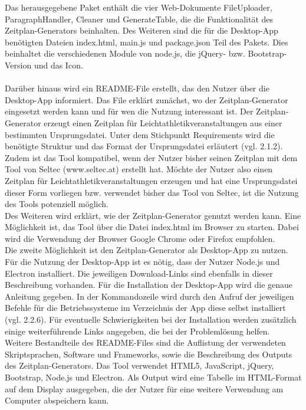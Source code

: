 Das herausgegebene Paket enthält die vier Web-Dokumente FileUploader, ParagraphHandler, Cleaner und GenerateTable, die die Funktionalität des Zeitplan-Generators beinhalten. Des Weiteren sind die für die Desktop-App benötigten Dateien index.html, main.js und package.json Teil des Pakets. Dies beinhaltet die verschiedenen Module von node.js, die jQuery- bzw. Bootstrap-Version und das Icon. \\
\\
Darüber hinaus wird ein README-File erstellt, das den Nutzer über die Desktop-App informiert. Das File erklärt zunächst, wo der Zeitplan-Generator eingesetzt werden kann und für wen die Nutzung interessant ist. Der Zeitplan-Generator erzeugt einen Zeitplan für Leichtathletikveranstaltungen aus einer bestimmten Ursprungsdatei. Unter dem Stichpunkt Requirements wird die benötigte Struktur und das Format der Ursprungsdatei erläutert (vgl. 2.1.2). Zudem ist das Tool kompatibel, wenn der Nutzer bisher seinen Zeitplan mit dem Tool von Seltec (www.seltec.at) erstellt hat. Möchte der Nutzer also einen Zeitplan für Leichtathletikveranstaltungen erzeugen und hat eine Ursprungsdatei dieser Form vorliegen bzw. verwendet bisher das Tool von Seltec, ist die Nutzung des Tools potenziell möglich.\\
Des Weiteren wird erklärt, wie der Zeitplan-Generator genutzt werden kann. Eine Möglichkeit ist, das Tool über die Datei index.html im Browser zu starten. Dabei wird die Verwendung der Browser Google Chrome oder Firefox empfohlen. \\
Die zweite Möglichkeit ist den Zeitplan-Generator als Desktop-App zu nutzen. Für die Nutzung der Desktop-App ist es nötig, dass der Nutzer Node.js und Electron installiert. Die jeweiligen Download-Links sind ebenfalls in dieser Beschreibung vorhanden. Für die Installation der Desktop-App wird die genaue Anleitung gegeben. In der Kommandozeile wird durch den Aufruf der jeweiligen Befehle für die Betriebssysteme im Verzeichnis der App diese selbst installiert (vgl. 2.2.6). Für eventuelle Schwierigkeiten bei der Installation werden zusätzlich einige weiterführende Links angegeben, die bei der Problemlösung helfen.\\
Weitere Bestandteile des README-Files sind die Auflistung der verwendeten Skriptsprachen, Software und Frameworks, sowie die Beschreibung des Outputs des Zeitplan-Generators. Das Tool verwendet HTML5, JavaScript, jQuery, Bootstrap, Node.js und Electron. Als Output wird eine Tabelle im HTML-Format auf dem Display ausgegeben, die der Nutzer für eine weitere Verwendung am Computer abspeichern kann.
